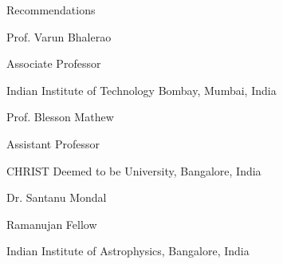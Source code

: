 \begin{section}{Recommendations}
    \begin{subsectionnobullet}{Prof. Varun Bhalerao}{}{}{}
        \item{Associate Professor}
        \item{Indian Institute of Technology Bombay, Mumbai, India}
    \end{subsectionnobullet}
        
    \begin{subsectionnobullet}{Prof. Blesson Mathew}{}{}{}
        \item{Assistant Professor}
        \item{CHRIST Deemed to be University, Bangalore, India}
    \end{subsectionnobullet}
        
    \begin{subsectionnobullet}{Dr. Santanu Mondal}{}{}{}
        \item{Ramanujan Fellow}
        \item{Indian Institute of Astrophysics, Bangalore, India}
    \end{subsectionnobullet}

\end{section}